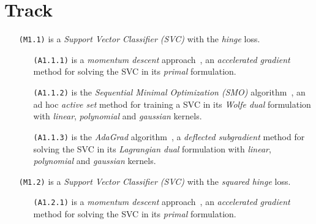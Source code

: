 \section{Track}

\begin{itemize}
\item[\texttt{(M1.1)}] is a \emph{Support Vector Classifier (SVC)} with the \emph{hinge} loss.

\begin{itemize}
\item[\texttt{(A1.1.1)}] is a \emph{momentum descent} approach~\cite{polyak1964some, nesterov1998introductory, nesterov1983method}, an \emph{accelerated gradient} method for solving the SVC in its \emph{primal} formulation.

\item[\texttt{(A1.1.2)}] is the \emph{Sequential Minimal Optimization (SMO)} algorithm~\cite{platt1998sequential, keerthi2001improvements}, an ad hoc \emph{active set} method for training a SVC in its \emph{Wolfe dual} formulation with \emph{linear}, \emph{polynomial} and \emph{gaussian} kernels.

\item[\texttt{(A1.1.3)}] is the \emph{AdaGrad} algorithm~\cite{duchi2011adaptive}, a \emph{deflected subgradient} method for solving the SVC in its \emph{Lagrangian dual} formulation with \emph{linear}, \emph{polynomial} and \emph{gaussian} kernels.
\end{itemize}

\end{itemize}

\begin{itemize}
\item[\texttt{(M1.2)}] is a \emph{Support Vector Classifier (SVC)} with the \emph{squared hinge} loss.

\begin{itemize}
\item[\texttt{(A1.2.1)}] is a \emph{momentum descent} approach~\cite{polyak1964some, nesterov1998introductory, nesterov1983method}, an \emph{accelerated gradient} method for solving the SVC in its \emph{primal} formulation.
\end{itemize}

\end{itemize}

\bigskip

